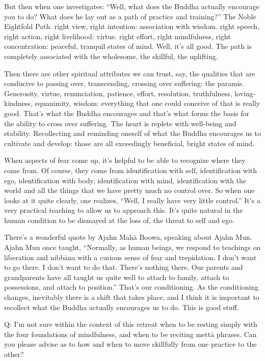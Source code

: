 But then when one investigates: “Well, what does the Buddha actually
encourage you to do? What does he lay out as a path of practice and
training?” The Noble Eightfold Path. right view, right intention:
association with wisdom. right speech, right action, right livelihood:
virtue. right effort, right mindfulness, right concentration: peaceful,
tranquil states of mind. Well, it’s all good. The path is completely
associated with the wholesome, the skillful, the uplifting.

Then there are other spiritual attributes we can trust, say, the
qualities that are conducive to passing over, transcending, crossing
over suffering: the paramis. Generosity, virtue, renunciation, patience,
effort, resolution, truthfulness, loving-kindness, equanimity, wisdom:
everything that one could conceive of that is really good. That’s what
the Buddha encourages and that’s what forms the basis for the ability to
cross over suffering. The heart is replete with well-being and
stability. Recollecting and reminding oneself of what the Buddha
encourages us to cultivate and develop: those are all exceedingly
beneficial, bright states of mind.

When aspects of fear come up, it’s helpful to be able to recognize where
they come from. Of course, they come from identification with self,
identification with ego, identification with body, identification with
mind, identification with the world and all the things that we have
pretty much no control over. So when one looks at it quite clearly, one
realizes, “Well, I really have very little control.” It’s a very
practical teaching to allow us to approach this. It’s quite natural in
the human condition to be dismayed at the loss of, the threat to self
and ego.

There’s a wonderful quote by Ajahn Mahā Boowa, speaking about Ajahn Mun.
Ajahn Mun once taught, “Normally, as human beings, we respond to
teachings on liberation and nibbāna with a curious sense of fear and
trepidation. I don’t want to go there. I don’t want to do that. There’s
nothing there. Our parents and grandparents have all taught us quite
well to attach to family, attach to possessions, and attach to
position.” That’s our conditioning. As the conditioning changes,
inevitably there is a shift that takes place, and I think it is
important to recollect what the Buddha actually encourages us to do.
This is good stuff.

\qaspace
Q: I’m not sure within the context of this retreat when to be resting
simply with the four foundations of mindfulness, and when to be reciting
mettā phrases. Can you please advise as to how and when to move
skillfully from one practice to the other?

